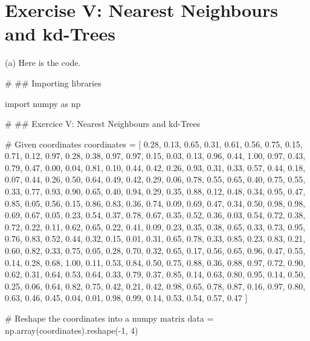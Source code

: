 \section{Exercise V: Nearest Neighbours and kd-Trees}

(a) Here is the code.

\begin{Python}
    #%
    ## Importing libraries
    
    import numpy as np
    
    #%
    ## Exercice V: Nearest Neighbours and kd-Trees
    
    # Given coordinates
    coordinates = [
        0.28, 0.13, 0.65, 0.31, 0.61, 0.56, 0.75, 0.15,
        0.71, 0.12, 0.97, 0.28, 0.38, 0.97, 0.97, 0.15,
        0.03, 0.13, 0.96, 0.44, 1.00, 0.97, 0.43, 0.79,
        0.47, 0.00, 0.04, 0.81, 0.10, 0.44, 0.42, 0.26,
        0.93, 0.31, 0.33, 0.57, 0.44, 0.18, 0.07, 0.44,
        0.26, 0.50, 0.64, 0.49, 0.42, 0.29, 0.06, 0.78,
        0.55, 0.65, 0.40, 0.75, 0.55, 0.33, 0.77, 0.93,
        0.90, 0.65, 0.40, 0.94, 0.29, 0.35, 0.88, 0.12,
        0.48, 0.34, 0.95, 0.47, 0.85, 0.05, 0.56, 0.15,
        0.86, 0.83, 0.36, 0.74, 0.09, 0.69, 0.47, 0.34,
        0.50, 0.98, 0.98, 0.69, 0.67, 0.05, 0.23, 0.54,
        0.37, 0.78, 0.67, 0.35, 0.52, 0.36, 0.03, 0.54,
        0.72, 0.38, 0.72, 0.22, 0.11, 0.62, 0.65, 0.22,
        0.41, 0.09, 0.23, 0.35, 0.38, 0.65, 0.33, 0.73,
        0.95, 0.76, 0.83, 0.52, 0.44, 0.32, 0.15, 0.01,
        0.31, 0.65, 0.78, 0.33, 0.85, 0.23, 0.83, 0.21,
        0.60, 0.82, 0.33, 0.75, 0.05, 0.28, 0.70, 0.32,
        0.65, 0.17, 0.56, 0.65, 0.96, 0.47, 0.55, 0.14,
        0.28, 0.68, 1.00, 0.11, 0.53, 0.84, 0.50, 0.75,
        0.88, 0.36, 0.88, 0.97, 0.72, 0.90, 0.62, 0.31,
        0.64, 0.53, 0.64, 0.33, 0.79, 0.37, 0.85, 0.14,
        0.63, 0.80, 0.95, 0.14, 0.50, 0.25, 0.06, 0.64,
        0.82, 0.75, 0.42, 0.21, 0.42, 0.98, 0.65, 0.78,
        0.87, 0.16, 0.97, 0.80, 0.63, 0.46, 0.45, 0.04,
        0.01, 0.98, 0.99, 0.14, 0.53, 0.54, 0.57, 0.47
    ]
    
    # Reshape the coordinates into a numpy matrix
    data = np.array(coordinates).reshape(-1, 4)
    
\end{Python}

